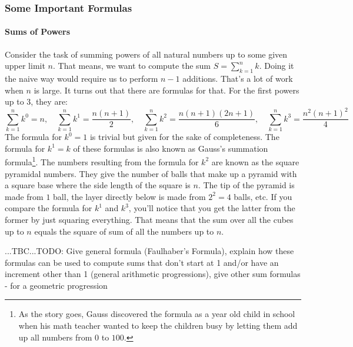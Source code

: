 


\subsubsection{Some Important Formulas}

\paragraph{Sums of Powers}
Consider the task of summing powers of all natural numbers up to some given upper limit $n$. That means, we want to compute the sum $S = \sum_{k=1}^{n} k$. Doing it the naive way would require us to perform $n-1$ additions. That's a lot of work when $n$ is large. It turns out that there are formulas for that. For the first powers up to 3, they are:
\begin{equation}
\sum_{k=1}^{n} k^0 = n, \quad
\sum_{k=1}^{n} k^1 = \frac{n (n+1)}{2}, \quad
\sum_{k=1}^{n} k^2 = \frac{n (n+1) (2 n  + 1) }{6}, \quad
\sum_{k=1}^{n} k^3 = \frac{n^2 (n+1)^2}{4}
\end{equation}
The formula for $k^0 = 1$ is trivial but given for the sake of completeness. The formula for $k^1 = k$ of these formulas is also known as Gauss's summation formula\footnote{As the story goes, Gauss discovered the formula as a year old child in school when his math teacher wanted to keep the children busy by letting them add up all numbers from $0$ to $100$.}. The numbers resulting from the formula for $k^2$ are known as the square pyramidal numbers. They give the number of balls that make up a pyramid with a square base where the side length of the square is $n$. The tip of the pyramid is made from $1$ ball, the layer directly below is made from $2^2 = 4$ balls, etc. If you compare the formula for $k^1$ and $k^3$, you'll notice that you get the latter from the former by just squaring everything. That means that the sum over all the cubes up to $n$ equals the square of sum of all the numbers up to $n$.

...TBC...TODO: Give general formula (Faulhaber's Formula), explain how these formulas can be used to compute sums that don't start at 1 and/or have an increment other than 1 (general arithmetic progressions), give other sum formulas - for a geometric progression

